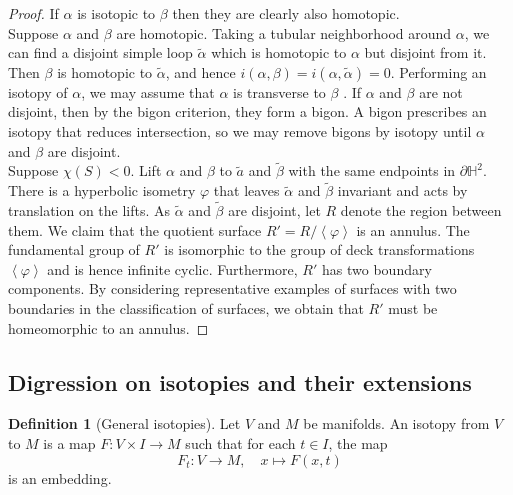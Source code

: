 \documentclass[reqno]{amsart}
\theoremstyle{definition}
\newtheorem{definition}[theorem]{Definition}
\theoremstyle{remark}
\begin{document}
\begin{proof}
    If $\alpha$ is isotopic to $\beta$ then they are clearly also
    homotopic.\\
    \linebreak
    Suppose $\alpha$ and $\beta$ are homotopic. Taking a
    tubular neighborhood around $\alpha$, we can find
    a disjoint simple loop $\tilde{\alpha}$ which is homotopic to
    $\alpha$ but disjoint from it. Then $\beta$ is homotopic
    to $\tilde{\alpha}$, and hence
    $i \left( \alpha, \beta \right) 
    = i \left( \alpha, \tilde{\alpha} \right) = 0$.
    Performing an isotopy of $\alpha$, we may assume that
    $\alpha$ is transverse to $\beta$ .
    If $\alpha$ and $\beta$ are not disjoint, then by
    the bigon criterion, they form a bigon. A bigon
    prescribes an isotopy that reduces intersection, so we
    may remove bigons by isotopy until $\alpha$ and $\beta$ are
    disjoint.\\
    \linebreak
    Suppose $\chi (S) <0$. Lift $\alpha$ and $\beta$ to
    $\tilde{a}$ and $\tilde{\beta}$ with the
    same endpoints in $\partial \mathbb{H}^2$. There
    is a hyperbolic isometry $\varphi$ that leaves
    $\tilde{\alpha}$ and $\tilde{\beta}$ invariant and
    acts by translation on the lifts. As $\tilde{\alpha}$ and
    $\tilde{\beta}$ are disjoint, let $R$ denote the region
    between them. We claim that the quotient surface
    $R' = R / \left<\varphi \right>$ is an annulus.
    The fundamental group of $R'$ is isomorphic to the group of
    deck transformations $\left<\varphi \right>$ and is hence
    infinite cyclic. Furthermore, $R'$ has two boundary components.
    By considering representative examples of surfaces
    with two boundaries in the classification of surfaces,
    we obtain that $R'$ must be homeomorphic to an annulus.
\end{proof}



\subsection{Digression on isotopies and their extensions}

\begin{definition}[General isotopies]
    Let $V$ and $M$ be manifolds. An
    isotopy from $V$ to $M$ is a map
    $F \colon V \times I \to M$ such that
    for each $t \in I$, the map
    \[
    F_t \colon V \to M, \quad x \mapsto F(x,t)
    \] 
    is an embedding.
\end{definition}
\end{document}
